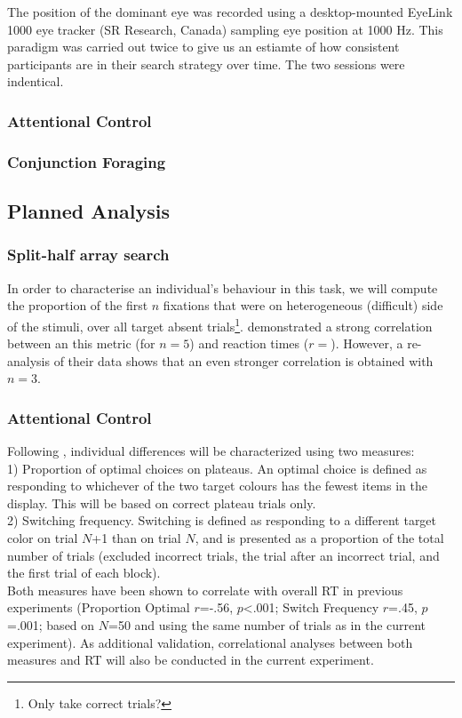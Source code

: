 \documentclass[]{rsos}%
\begin{document}
The position of the dominant eye was recorded using a desktop-mounted EyeLink 1000 eye
tracker (SR Research, Canada) sampling eye position at 1000 Hz.
This paradigm was carried out twice to give us an estiamte of how consistent participants are in their search strategy over time. The two sessions were indentical.

\subsubsection{Attentional Control}

\subsubsection{Conjunction Foraging}

\subsection{Planned Analysis}

\subsubsection{Split-half array search}

In order to characterise an individual's behaviour in this task, we will compute the proportion of the first $n$ fixations that were on heterogeneous (difficult) side of the stimuli, over all target absent trials\footnote{Only take correct trials?}. \cite{nowakowsak2017} demonstrated a strong correlation between an this metric (for $n=5$) and reaction times ($r=$). However, a re-analysis of their data shows that an even stronger correlation is obtained with $n=3$.



\subsubsection{Attentional Control}

Following \cite{irons-leber2016}, individual differences will be characterized using two measures:\\
1) Proportion of optimal choices on plateaus. An optimal choice is defined as responding to whichever of the two target colours has the fewest items in the display. This will be based on correct plateau trials only. \\ 
2) Switching frequency. Switching is defined as responding to a different target color on trial $N$+1 than on trial $N$, and is presented as a proportion of the total number of trials (excluded incorrect trials, the trial after an incorrect trial, and the first trial of each block).\\
Both measures have been shown to correlate with overall RT in previous experiments (Proportion Optimal $r$=-.56, $p$<.001; Switch Frequency $r$=.45, $p$=.001; based on $N$=50 and using the same number of trials as in the current experiment). As additional validation, correlational analyses between both measures and RT will also be conducted in the current experiment.
\end{document}
